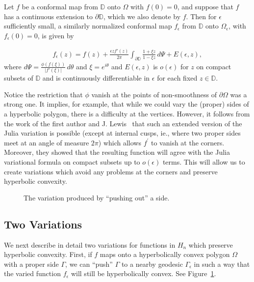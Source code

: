 \documentclass{lms}
\newcommand{\D}{\mathbb D}
\newcommand{\abs}[1]{\lvert#1\rvert}
\newcommand{\e}{\epsilon}
\numberwithin{equation}{section}
\begin{document}
\begin{julia*}
Let  $f$ be a conformal map from $\D$ onto $\Omega$ with $f(0)=0$,
and suppose that $f$ has a continuous extension to $\partial\D$, which we also
denote by $f$. Then for $\e$ sufficiently small,
a similarly normalized conformal map $f_{\e}$ from $\D$ 
onto $\Omega_\epsilon$, 
with $f_{\e}(0) = 0$, is given by 

\begin{align}\label{E:julia}
f_\epsilon(z) = f(z)+\frac{\epsilon z f'(z)}{2\pi}\int_{\partial \D}
\frac{1+\xi z}{1-\xi z}\,d\Psi + E(\e,z),
\end{align}
where $d\Psi=\frac{\phi(f(\xi))}{\abs{f'(\xi)}}\,d\theta$ and $\xi=e^{i\theta}$
and $E(\e,z)$ is $o(\e)$ for $z$ on compact subsets of $\D$ and is continuously 
differentiable in $\epsilon$ for each fixed $z\in\D$.
\end{julia*}

Notice the restriction that $\phi$ vanish at the points of non-smoothness
of $\partial \Omega$ was a strong one.  It implies, for example, that while we
could vary the (proper) sides of a hyperbolic polygon, there is a difficulty
at the vertices.
However, it follows from the work of the first author
and J. Lewis~\cite{BL75} that 
such an extended version of the Julia 
 variation is possible (except at internal cusps, ie., 
where two proper sides meet at an angle 
of measure $2\pi$) which allows $f^\prime$ to vanish at the corners.
Moreover, they showed that the resulting function will agree
with the Julia variational formula on 
compact subsets up to $o(\epsilon)$ terms.
This will allow us to create variations which
 avoid any problems at the corners and preserve hyperbolic convexity.
 

\begin{figure}
\begin{center}
\caption{The variation produced by ``pushing out'' a side.}
\label{F:julia-out}
\end{center}
\end{figure}

\subsection{Two Variations}\label{SS:twovar}
We next describe in detail two variations for functions 
in $H_n$ which preserve hyperbolic convexity.
First, if $f$ maps onto a hyperbolically
 convex polygon $\Omega$ with a proper side $\Gamma$,
we can ``push'' $\Gamma$ to a nearby geodesic  $\Gamma_\epsilon$ 
in such a way that the varied
function $f_\epsilon$ will still be hyperbolically convex.  See
Figure~\ref{F:julia-out}.
\end{document}
